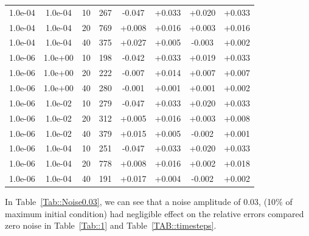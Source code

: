 \documentclass[11pt,a4paper]{article}
\begin{document}
\begin{table}
\begin{tabular}{*{8}c}
 1.0e-04 	 & 1.0e-04 	 & 10 & 267 	 & -0.047 & +0.033 & +0.020 & +0.033 \\ 
 1.0e-04 	 & 1.0e-04 	 & 20 & 769 	 & +0.008 & +0.016 & +0.003 & +0.016 \\
 1.0e-04 	 & 1.0e-04 	 & 40 & 375 	 & +0.027 & +0.005 & -0.003 & +0.002 \\ 
 
 1.0e-06 	 & 1.0e+00 	 & 10 & 198 	 & -0.042 & +0.033 & +0.019 & +0.033 \\ 
 1.0e-06 	 & 1.0e+00 	 & 20 & 222 	 & -0.007 & +0.014 & +0.007 & +0.007 \\ 
 1.0e-06 	 & 1.0e+00 	 & 40 & 280 	 & -0.001 & +0.001 & +0.001 & +0.002 \\ 
 
 1.0e-06 	 & 1.0e-02 	 & 10 & 279 	 & -0.047 & +0.033 & +0.020 & +0.033 \\ 
 1.0e-06 	 & 1.0e-02 	 & 20 & 312 	 & +0.005 & +0.016 & +0.003 & +0.008 \\ 
 1.0e-06 	 & 1.0e-02 	 & 40 & 379 	 & +0.015 & +0.005 & -0.002 & +0.001 \\
 
 1.0e-06 	 & 1.0e-04 	 & 10 & 251 	 & -0.047 & +0.033 & +0.020 & +0.033 \\ 
 1.0e-06 	 & 1.0e-04 	 & 20 & 778 	 & +0.008 & +0.016 & +0.002 & +0.018 \\ 
 1.0e-06 	 & 1.0e-04 	 & 40 & 191 	 & +0.017 & +0.004 & -0.002 & +0.002 \\ 
 

\end{tabular}
\label{TAB::double}
\end{table} 



In Table~\ref{Tab::Noise0.03}, we can see that a noise amplitude of 0.03, (10$\%$ of maximum initial condition) had negligible effect on the relative errors compared zero noise in Table~\ref{Tab::1} and Table~\ref{TAB::timesteps}. 
\end{document}
